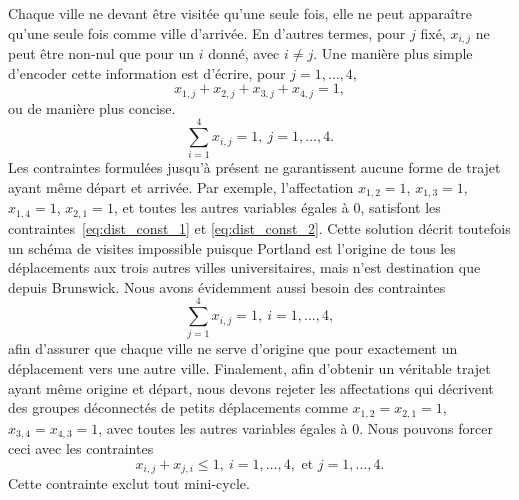 \begin{example}
Chaque ville ne devant être visitée qu'une seule fois, elle ne peut apparaître qu'une seule fois comme ville d'arrivée.
En d'autres termes, pour $j$ fixé, $x_{i,j}$ ne peut être non-nul que pour un $i$ donné, avec $i \ne j$.
Une manière plus simple d'encoder cette information est d'écrire, pour $j = 1,\ldots,4$,
\[
x_{1,j} + x_{2,j} + x_{3,j} + x_{4,j} = 1,
\]
ou de manière plus concise.
\begin{equation}
\sum_{i = 1}^4 x_{i,j} = 1,\ j = 1,\ldots,4.
\label{eq:dist_const_2}
\end{equation}
Les contraintes formulées jusqu'à présent ne garantissent aucune forme de trajet ayant même départ et arrivée.
Par exemple, l'affectation $x_{1,2} = 1$, $x_{1,3} = 1$, $x_{1,4} = 1$, $x_{2,1} = 1$, et toutes les autres variables égales à 0, satisfont les contraintes~\ref{eq:dist_const_1} et \ref{eq:dist_const_2}.
Cette solution décrit toutefois un schéma de visites impossible puisque Portland est l'origine de tous les déplacements aux trois autres villes universitaires, mais n'est destination que depuis Brunswick.
Nous avons évidemment aussi besoin des contraintes
\begin{equation}
\sum_{j = 1}^4 x_{i,j} = 1,\ i = 1,\ldots,4,
\label{eq:dist_const_3}
\end{equation}
afin d'assurer que chaque ville ne serve d'origine que pour exactement un déplacement vers une autre ville.
Finalement, afin d'obtenir un véritable trajet ayant même origine et départ, nous devons rejeter les affectations qui décrivent des groupes déconnectés de petits déplacements comme $x_{1,2} = x_{2,1} = 1$, $x_{3,4} = x_{4,3} = 1$, avec toutes les autres variables égales à 0.
Nous pouvons forcer ceci avec les contraintes
\[
x_{i,j} + x_{j ,i} \leq 1,\ i = 1,\ldots, 4,\mbox{ et }j = 1,\ldots,4.
\]
Cette contrainte exclut tout mini-cycle.


\end{example}
